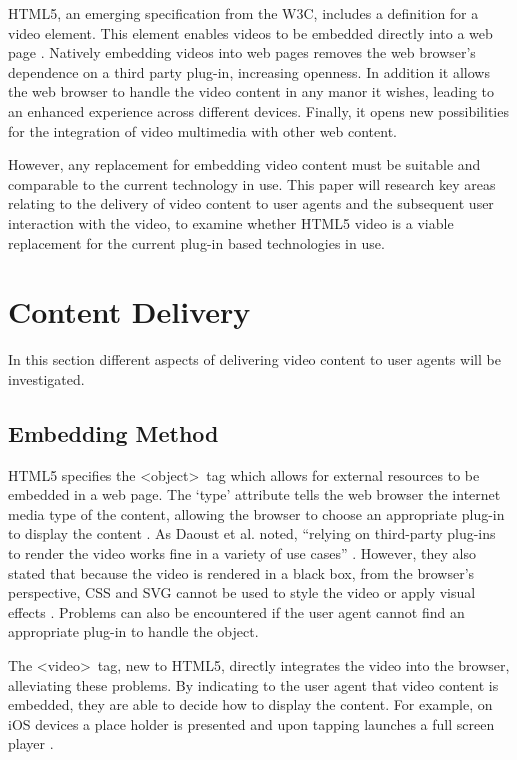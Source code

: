 \documentclass[journal]{IEEEtran}
\begin{document}
HTML5, an emerging specification from the W3C, includes a definition for a video element. This element enables videos to be embedded directly into a web page \cite{standard:html5}. Natively embedding videos into web pages removes the web browser's dependence on a third party plug-in, increasing openness. In addition it allows the web browser to handle the video content in any manor it wishes, leading to an enhanced experience across different devices. Finally, it opens new possibilities for the integration of video multimedia with other web content.

However, any replacement for embedding video content must be suitable and comparable to the current technology in use. This paper will research key areas relating to the delivery of video content to user agents and the subsequent user interaction with the video, to examine whether HTML5 video is a viable replacement for the current plug-in based technologies in use.

\section{Content Delivery}
In this section different aspects of delivering video content to user agents will be investigated.

\subsection{Embedding Method} 
HTML5 specifies the \textless object\textgreater~tag which allows for external resources to be embedded in a web page. The `type' attribute tells the web browser the internet media type of the content, allowing the browser to choose an appropriate plug-in to display the content \cite{standard:html5}. As Daoust et al. noted, ``relying on third-party plug-ins to render the video works fine in a variety of use cases'' \cite{article:towardsVideoOnTheWebWithHTML5}. However, they also stated that because the video is rendered in a black box, from the browser's perspective, CSS and SVG cannot be used to style the video or apply visual effects \cite{article:towardsVideoOnTheWebWithHTML5}. Problems can also be encountered if the user agent cannot find an appropriate plug-in to handle the object.

The \textless video\textgreater~tag, new to HTML5, directly integrates the video into the browser, alleviating these problems. By indicating to the user agent that video content is embedded, they are able to decide how to display the content. For example, on iOS devices a place holder is presented and upon tapping launches a full screen player \cite{website:safariHTML5}.
\end{document}
